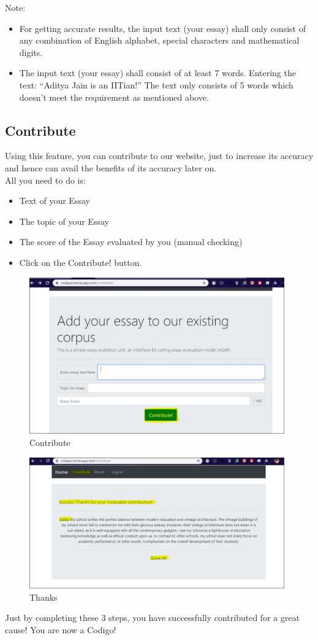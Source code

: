 \documentclass{article}
\begin{document}
Note:
\begin{itemize}
    \item For getting accurate results, the input text (your essay) shall only consist of any combination of English alphabet, special characters and mathematical digits.
    \item The input text (your essay) shall consist of at least 7 words.
        Entering the text: “Aditya Jain is an IITian!”
        The text only consists of 5 words which doesn’t meet the requirement as mentioned above.
\end{itemize}
\subsection{Contribute}
Using this feature, you can contribute to our website, just to increase its accuracy and hence can avail the benefits of its accuracy later on.\\
All you need to do is:
\begin{itemize}
    \item Text of your Essay
    \item The topic of your Essay
    \item The score of the Essay evaluated by you (manual checking)
    \item Click on the Contribute! button.
\end{itemize}
\begin{figure}
    \includegraphics[width=11cm]{3}
    \caption{\label{fig:your-figure2}Contribute}
    \end{figure}
    \begin{figure}
    \includegraphics[width=11cm]{4}
    \caption{\label{fig:your-figure2}Thanks}
    \end{figure}
Just by completing these 3 steps, you have successfully contributed for a great cause! You are now a Codigo!
\end{document}
